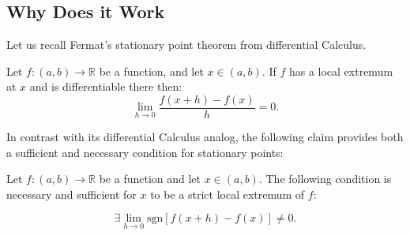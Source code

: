 \documentclass[11pt]{book}
\begin{document}
\subsection{Why Does it Work}

Let us recall Fermat's stationary point theorem from differential Calculus.

\label{Fermat's Theorem}
\begin{theorem}
Let $f:\left(a,b\right)\rightarrow\mathbb{R}$ be a function, and let $x\in \left(a,b\right).$ If $f$ has a local extremum at $x$ and is differentiable there then:
$$\underset{h\rightarrow0}{\lim}\frac{f\left(x+h\right)-f\left(x\right)}{h}=0.$$
\label{fermat_for_derivative}
\end{theorem}

In contrast with its differential Calculus analog, the following claim provides both a sufficient and necessary condition for stationary points:

\begin{theorem}Let $f:\left(a,b\right)\rightarrow\mathbb{R}$ be a function and let $x\in \left(a,b\right).$ The following condition is necessary and sufficient for $x$ to be a strict local extremum of $f$:

$$\exists \underset{h\rightarrow0}{\lim}\text{sgn}\left[f\left(x+h\right)-f\left(x\right)\right]\neq0.$$
\label{fermat_semi_discrete}
\end{theorem}
\end{document}
